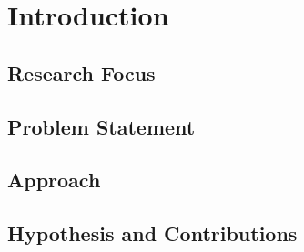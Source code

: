 \chapter{Introduction}

\section{Research Focus}
 
\section{Problem Statement}

\section{Approach}

\section{Hypothesis and Contributions}

